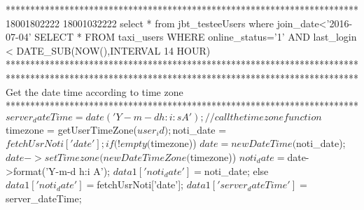 {{{{************************************************************************
18001802222
18001032222
select * from jbt_testeeUsers where join_date<'2016-07-04'
SELECT * FROM taxi_users WHERE online_status='1' AND last_login < DATE_SUB(NOW(),INTERVAL 14 HOUR)
************************************************************************
************************************************************************
Get the date time according to time zone
************************************************************************
$server_dateTime = date('Y-m-d h:i:s A');
//call the timezone function
$timezone = getUserTimeZone($user_id);  

$noti_date = $fetchUsrNoti['date'];
if(!empty($timezone)){
    $date = new DateTime($noti_date);
    $date->setTimezone(new DateTimeZone($timezone))
    $noti_date = $date->format('Y-m-d h:i A');
    $data1['noti_date'] = $noti_date;
}else{
    $data1['noti_date'] = $fetchUsrNoti['date'];
}
$data1['server_dateTime'] = $server_dateTime;

}}}}
